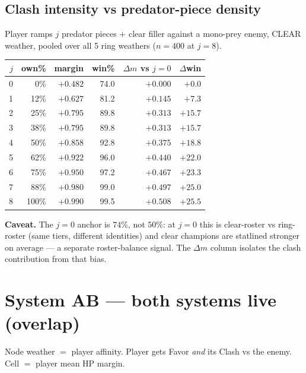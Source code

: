 \documentclass[11pt]{article}
\newcommand{\bl}[1]{\textcolor{blue!65!black}{#1}}
\begin{document}
\subsection*{Clash intensity vs predator-piece density}

Player ramps $j$ predator pieces $+$ clear filler against a mono-prey enemy, CLEAR
weather, pooled over all 5 ring weathers ($n=400$ at $j{=}8$).

\begin{center}
\begin{tabular}{r r r r r r}
\hline
$j$ & own\% & margin & win\% & $\Delta m$ vs $j{=}0$ & $\Delta$win \\
\hline
0 &   0\% & $+0.482$ & 74.0 & $+0.000$ & $+0.0$ \\
1 &  12\% & $+0.627$ & 81.2 & $+0.145$ & $+7.3$ \\
2 &  25\% & $+0.795$ & 89.8 & $+0.313$ & $+15.7$ \\
3 &  38\% & $+0.795$ & 89.8 & $+0.313$ & $+15.7$ \\
4 &  50\% & $+0.858$ & 92.8 & $+0.375$ & $+18.8$ \\
5 &  62\% & $+0.922$ & 96.0 & $+0.440$ & $+22.0$ \\
6 &  75\% & $+0.950$ & 97.2 & $+0.467$ & $+23.3$ \\
7 &  88\% & $+0.980$ & 99.0 & $+0.497$ & $+25.0$ \\
8 & 100\% & $+0.990$ & 99.5 & \bl{$+0.508$} & \bl{$+25.5$} \\
\hline
\end{tabular}
\end{center}

\textbf{Caveat.} The $j{=}0$ anchor is $74\%$, not $50\%$: at $j{=}0$ this is
clear-roster vs ring-roster (same tiers, different identities) and clear champions
are statlined stronger on average --- a separate roster-balance signal. The
$\Delta m$ column isolates the clash contribution from that bias.

\section{System AB --- both systems live (overlap)}

Node weather $=$ player affinity. Player gets Favor \emph{and} its Clash vs the
enemy. Cell $=$ player mean HP margin.
\end{document}

